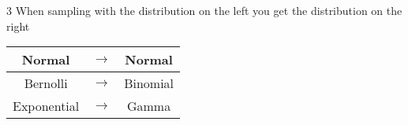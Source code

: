 \documentclass[8pt,landscape]{extarticle}
\newcommand\NumCols{3}
\begin{document}
\begin{multicols}{\NumCols}
When sampling with the distribution on the left you get the distribution on the right \\
\begin{tabular}{| c  c  c |}
\hline
Normal & $\rightarrow$ & Normal\\ \hline
Bernolli & $\rightarrow$ &  Binomial\\ \hline
Exponential & $\rightarrow$ & Gamma\\ \hline
\end{tabular}

\scriptsize
 

\end{multicols}
\end{document}
